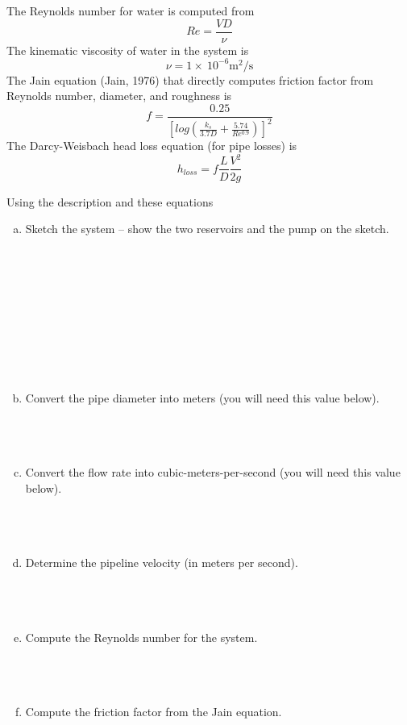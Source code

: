 \documentclass[11pt]{article}
\begin{document}
\begin{enumerate}
The Reynolds number for water is computed from
\begin{equation}
{Re}=\frac{VD}{\nu}
\end{equation}
The kinematic viscosity of water in the system is 
\begin{equation}
{\nu}=1\times~10^{-6} \text{m}^2/\text{s}
\end{equation}
The Jain equation (Jain, 1976) that directly computes friction factor from Reynolds number, diameter, and roughness is 
\begin{equation}
f = \frac{0.25}{[log(\frac{k_s}{3.7D} + \frac{5.74}{Re^{0.9}})]^2}
\end{equation}
The Darcy-Weisbach head loss equation (for pipe losses) is
\begin{equation}
h_{loss}=f\frac{L}{D}\frac{V^2}{2g}
\end{equation}

Using the description and these equations 
\begin{enumerate}[a)]
\item Sketch the system -- show the two reservoirs and the pump on the sketch.\\
~\\
~\\
~\\
~\\
~\\
~\\
~\\
~\\
~\\
\item Convert the pipe diameter into meters (you will need this value below).\\
~\\
~\\
~\\

\item Convert the flow rate into cubic-meters-per-second (you will need this value below).\\
~\\
~\\
~\\

\item Determine the pipeline velocity (in meters per second).\\
~\\
~\\
~\\
\item Compute the Reynolds number for the system.\\
~\\
~\\
~\\
\item Compute the friction factor from the Jain equation.\\
~\\
~\\
~\\


\end{enumerate}
\end{enumerate}
\end{document}
